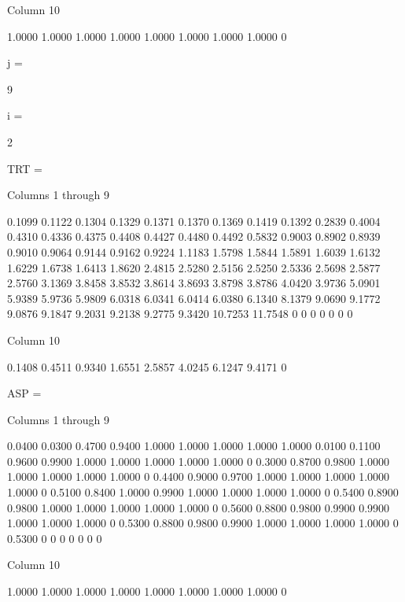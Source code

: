   Column 10

    1.0000
    1.0000
    1.0000
    1.0000
    1.0000
    1.0000
    1.0000
    1.0000
         0


j =

     9


i =

     2


TRT =

  Columns 1 through 9

    0.1099    0.1122    0.1304    0.1329    0.1371    0.1370    0.1369    0.1419    0.1392
    0.2839    0.4004    0.4310    0.4336    0.4375    0.4408    0.4427    0.4480    0.4492
    0.5832    0.9003    0.8902    0.8939    0.9010    0.9064    0.9144    0.9162    0.9224
    1.1183    1.5798    1.5844    1.5891    1.6039    1.6132    1.6229    1.6738    1.6413
    1.8620    2.4815    2.5280    2.5156    2.5250    2.5336    2.5698    2.5877    2.5760
    3.1369    3.8458    3.8532    3.8614    3.8693    3.8798    3.8786    4.0420    3.9736
    5.0901    5.9389    5.9736    5.9809    6.0318    6.0341    6.0414    6.0380    6.1340
    8.1379    9.0690    9.1772    9.0876    9.1847    9.2031    9.2138    9.2775    9.3420
   10.7253   11.7548         0         0         0         0         0         0         0

  Column 10

    0.1408
    0.4511
    0.9340
    1.6551
    2.5857
    4.0245
    6.1247
    9.4171
         0


ASP =

  Columns 1 through 9

    0.0400    0.0300    0.4700    0.9400    1.0000    1.0000    1.0000    1.0000    1.0000
    0.0100    0.1100    0.9600    0.9900    1.0000    1.0000    1.0000    1.0000    1.0000
         0    0.3000    0.8700    0.9800    1.0000    1.0000    1.0000    1.0000    1.0000
         0    0.4400    0.9000    0.9700    1.0000    1.0000    1.0000    1.0000    1.0000
         0    0.5100    0.8400    1.0000    0.9900    1.0000    1.0000    1.0000    1.0000
         0    0.5400    0.8900    0.9800    1.0000    1.0000    1.0000    1.0000    1.0000
         0    0.5600    0.8800    0.9800    0.9900    0.9900    1.0000    1.0000    1.0000
         0    0.5300    0.8800    0.9800    0.9900    1.0000    1.0000    1.0000    1.0000
         0    0.5300         0         0         0         0         0         0         0

  Column 10

    1.0000
    1.0000
    1.0000
    1.0000
    1.0000
    1.0000
    1.0000
    1.0000
         0


